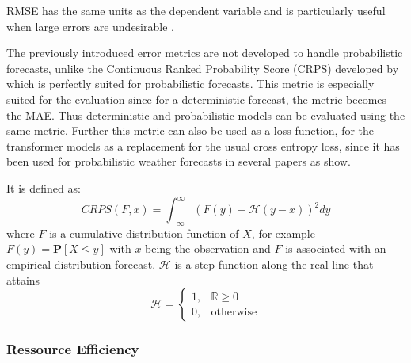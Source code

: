 \documentclass{article}
\begin{document}
RMSE has the same units as the dependent variable and is particularly useful when large errors are undesirable \cite{MAE_RMSE}.\par 

The previously introduced error metrics are not developed to handle probabilistic forecasts, unlike the Continuous Ranked Probability Score (CRPS) developed by \cite{Loss_Function} which is perfectly suited for probabilistic forecasts. This metric is especially suited for the evaluation since for a deterministic forecast, the metric becomes the MAE. Thus deterministic and probabilistic models can be evaluated using the same metric. Further this metric can also be used as a loss function, for the transformer models as a replacement for the usual cross entropy loss, since it has been used for probabilistic weather forecasts in several papers as \cite{CRPS_example_1, CRPS_example_2, CRPS_example_3} show. \par 
It is defined as:
\begin{equation}\label{eq:CRPS}
    CRPS(F, x) = \int_{-\infty}^{\infty} ( F(y) - \mathcal{H}(y-x) )^{2} dy
\end{equation}
where $F$ is a cumulative distribution function of $X$, for example $F(y) = \mathbf{P}[X \leq y]$ with $x$ being the observation and $F$ is associated with an empirical distribution forecast. $\mathcal{H}$ is a step function along the real line that attains
\begin{equation}
    \mathcal{H} = \begin{cases}
        1, & \mathbb{R} \geq 0 \\
        0, & \text{otherwise}
    \end{cases}
\end{equation}

\subsubsection{Ressource Efficiency}
\end{document}
